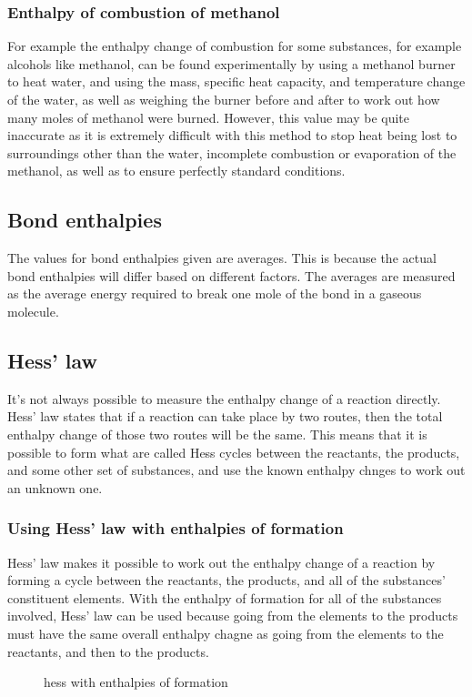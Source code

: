 \subsubsection{Enthalpy of combustion of methanol}
For example the enthalpy change of combustion for some substances, for example alcohols like methanol, can be found experimentally by using a methanol burner to heat water, and using the mass, specific heat capacity, and temperature change of the water, as well as weighing the burner before and after to work out how many moles of methanol were burned. However, this value may be quite inaccurate as it is extremely difficult with this method to stop heat being lost to surroundings other than the water, incomplete combustion or evaporation of the methanol, as well as to ensure perfectly standard conditions.

\subsection{Bond enthalpies}
The values for bond enthalpies given are averages. This is because the actual bond enthalpies will differ based on different factors. The averages are measured as the average energy required to break one mole of the bond in a gaseous molecule.

\subsection{Hess' law}
It's not always possible to measure the enthalpy change of a reaction directly. Hess' law states that if a reaction can take place by two routes, then the total enthalpy change of those two routes will be the same. This means that it is possible to form what are called Hess cycles between the reactants, the products, and some other set of substances, and use the known enthalpy chnges to work out an unknown one.

\subsubsection{Using Hess' law with enthalpies of formation}
Hess' law makes it possible to work out the enthalpy change of a reaction by forming a cycle between the reactants, the products, and all of the substances' constituent elements. With the enthalpy of formation for all of the substances involved, Hess' law can be used because going from the elements to the products must have the same overall enthalpy chagne as going from the elements to the reactants, and then to the products.
\begin{figure}[ht]
    \centering
    \caption{hess with enthalpies of formation}
    \label{fig:hess-with-enthalpies-of-formation}
\end{figure}

